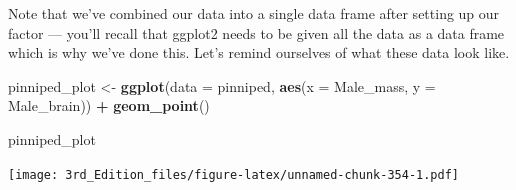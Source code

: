 \documentclass[
]{book}
\newenvironment{Shaded}{\begin{snugshade}}{\end{snugshade}}
\newcommand{\CommentTok}[1]{\textcolor[rgb]{0.56,0.35,0.01}{\textit{#1}}}
\newcommand{\DataTypeTok}[1]{\textcolor[rgb]{0.13,0.29,0.53}{#1}}
\newcommand{\DecValTok}[1]{\textcolor[rgb]{0.00,0.00,0.81}{#1}}
\newcommand{\KeywordTok}[1]{\textcolor[rgb]{0.13,0.29,0.53}{\textbf{#1}}}
\newcommand{\NormalTok}[1]{#1}
\newcommand{\OperatorTok}[1]{\textcolor[rgb]{0.81,0.36,0.00}{\textbf{#1}}}
\newcommand{\StringTok}[1]{\textcolor[rgb]{0.31,0.60,0.02}{#1}}
\begin{document}
\begin{Shaded}
\end{Shaded}

Note that we've combined our data into a single data frame after setting up our factor --- you'll recall that ggplot2 needs to be given all the data as a data frame which is why we've done this. Let's remind ourselves of what these data look like.

\begin{Shaded}
\begin{Highlighting}[]

\NormalTok{pinniped_plot <-}\StringTok{ }\KeywordTok{ggplot}\NormalTok{(}\DataTypeTok{data =}\NormalTok{ pinniped, }
                        \KeywordTok{aes}\NormalTok{(}\DataTypeTok{x =}\NormalTok{ Male_mass, }\DataTypeTok{y =}\NormalTok{ Male_brain)) }\OperatorTok{+}
\StringTok{        }\KeywordTok{geom_point}\NormalTok{()}

\NormalTok{pinniped_plot}
\end{Highlighting}
\end{Shaded}

\texttt{[image: 3rd\_Edition\_files/figure-latex/unnamed-chunk-354-1.pdf]}
\end{document}
